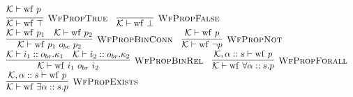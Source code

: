 \documentclass[fleqn]{article}
\begin{document}
\[
\begin{array}{l}
    \mathcal{K} \vdash \mathrm{wf}~p \\
    \infer[\textsc{WfPropTrue}]{\mathcal{K} \vdash \mathrm{wf}~\top}{} \hspace{1em}
    \infer[\textsc{WfPropFalse}]{\mathcal{K} \vdash \mathrm{wf}~\bot}{} \\
    \infer[\textsc{WfPropBinConn}]{\mathcal{K} \vdash \mathrm{wf}~p_1~o_{bc}~p_2}{\mathcal{K} \vdash \mathrm{wf}~p_1 & \mathcal{K} \vdash \mathrm{wf}~p_2} \hspace{1em}
    \infer[\textsc{WfPropNot}]{\mathcal{K} \vdash \mathrm{wf}~\neg p}{\mathcal{K} \vdash \mathrm{wf}~p} \hspace{1em} \\
    \infer[\textsc{WfPropBinRel}]{\mathcal{K} \vdash \mathrm{wf}~i_1~o_{br}~i_2}{\mathcal{K} \vdash i_1 :: o_{br}.\kappa_1 & \mathcal{K} \vdash i_2 :: o_{br}.\kappa_2} \hspace{1em}
    \infer[\textsc{WfPropForall}]{\mathcal{K} \vdash \mathrm{wf}~\forall \alpha :: s. p}{\mathcal{K},\alpha :: s \vdash \mathrm{wf}~p} \\
    \infer[\textsc{WfPropExists}]{\mathcal{K} \vdash \mathrm{wf}~\exists \alpha :: s. p}{\mathcal{K},\alpha :: s \vdash \mathrm{wf}~p}
\end{array}
\]
\end{document}
